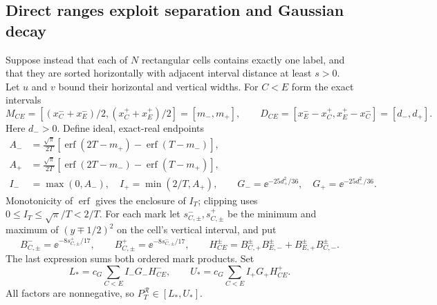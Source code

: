 \subsection{Direct ranges exploit separation and Gaussian decay}

Suppose instead that each of $N$ rectangular cells contains exactly one
label, and that they are sorted horizontally with adjacent interval
distance at least $s>0$. Let $u$ and $v$ bound their horizontal and
vertical widths. For $C<E$ form the exact intervals
\[
 M_{CE}=[(x_C^-+x_E^-)/2,(x_C^++x_E^+)/2]=[m_-,m_+],
 \qquad D_{CE}=[x_E^--x_C^+,x_E^+-x_C^-]=[d_-,d_+].
\]
Here $d_->0$. Define ideal, exact-real endpoints
\begin{align}
 A_-&=\frac{\sqrt\pi}{2T}
   [\operatorname{erf}(2T-m_+)-\operatorname{erf}(T-m_-)],\nonumber\\
 A_+&=\frac{\sqrt\pi}{2T}
   [\operatorname{erf}(2T-m_-)-\operatorname{erf}(T-m_+)],\nonumber\\
 I_-&=\max(0,A_-),\quad I_+=\min(2/T,A_+),\qquad
 G_-=\ee^{-25d_+^2/36},\quad G_+=\ee^{-25d_-^2/36}.
                                                        \label{eq:cell-endpoints}
\end{align}
Monotonicity of $\operatorname{erf}$ gives the enclosure of $I_T$;
clipping uses $0\le I_T\le\sqrt\pi/T<2/T$.
For each mark let $s_{C,\pm}^-,s_{C,\pm}^+$ be the minimum and maximum
of $(y\mp1/2)^2$ on the cell's vertical interval, and put
\[
 B_{C,\pm}^-=\ee^{-8s_{C,\pm}^+/17},\qquad
 B_{C,\pm}^+=\ee^{-8s_{C,\pm}^-/17},\qquad
 H_{CE}^\pm=B_{C,+}^\pm B_{E,-}^\pm+B_{E,+}^\pm B_{C,-}^\pm.
\]
The last expression sums both ordered mark products. Set
\begin{equation}\label{eq:ideal-cell-sum}
 L_*=c_G\sum_{C<E}I_-G_-H_{CE}^-,\qquad
 U_*=c_G\sum_{C<E}I_+G_+H_{CE}^+.
\end{equation}
All factors are nonnegative, so $P_T^{\mathcal R}\in[L_*,U_*]$.

